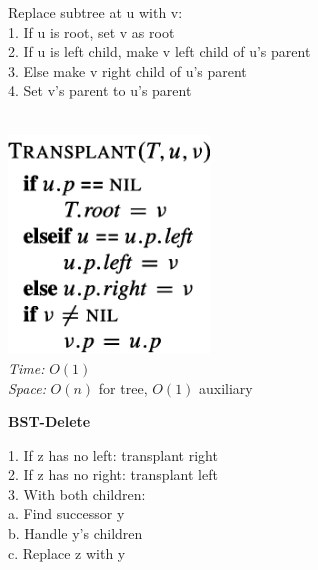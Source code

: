 {\begin{minipage}[t]{1\textwidth}
\begin{minipage}[t]{0.19\textwidth}
        \scriptsize
        \begin{minipage}[t]{\textwidth}
            \scriptsize
            Replace subtree at u with v:\\
            1. If u is root, set v as root\\
            2. If u is left child, make v left child of u's parent\\
            3. Else make v right child of u's parent\\
            4. Set v's parent to u's parent
        \end{minipage}\\[4pt]
        \includegraphics[width=0.4\textwidth]{images/bst-transplant.png}\\[2pt]
        \textit{Time:} \(O(1)\)\\
        \textit{Space:} \(O(n)\) for tree, \(O(1)\) auxiliary
    \end{minipage}
    \hfill
    \begin{minipage}[t]{0.19\textwidth}
        \centering
        \textbf{\scriptsize BST-Delete}\\[2pt]
        \scriptsize
        \begin{minipage}[t]{\textwidth}
            \scriptsize
            1. If z has no left: transplant right\\
            2. If z has no right: transplant left\\
            3. With both children:\\
            \quad a. Find successor y\\
            \quad b. Handle y's children\\
            \quad c. Replace z with y
        \end{minipage}\\[4pt]

\end{minipage}
\end{minipage}}
